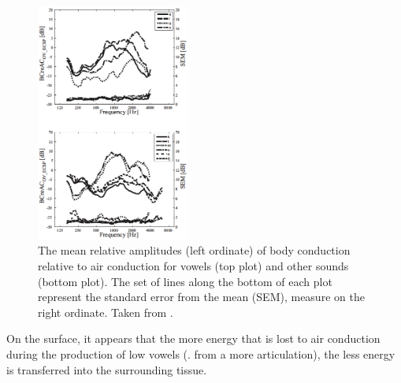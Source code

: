\begin{figure}
\includegraphics[width=0.45\textwidth]{figure/BC_rel_AC_all.png}
\caption{The mean relative amplitudes (left ordinate) of body conduction relative to air conduction for vowels (top plot) and other sounds (bottom plot).  The set of lines along the bottom of each plot represent the standard error from the mean (SEM), measure on the right ordinate.  Taken from \cite{reinfeldt:10}.}
\label{BCrelACall}
\end{figure}
%
On the surface, it appears \DIFdelbegin {}\DIFdelend that the more energy that is lost to air conduction during the production of low vowels (\DIFdelbegin {}\DIFdelend \DIFaddbegin {}\DIFaddend . from a more \DIFdelbegin {}\DIFdelend \DIFaddbegin {}\DIFaddend articulation), the less energy is transferred into the surrounding tissue.

